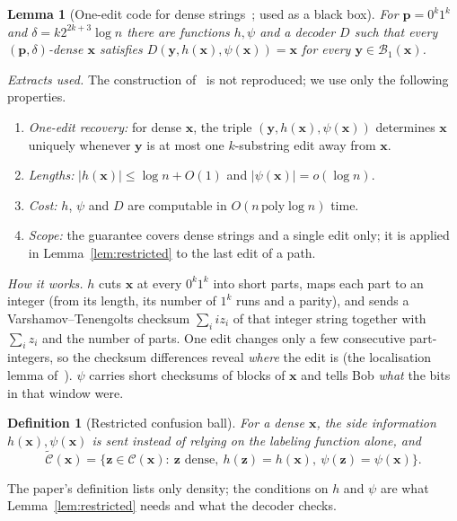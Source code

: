 \documentclass[journal,10pt]{IEEEtran}
\newtheorem{definition}{Definition}
\newtheorem{lemma}{Lemma}
\newcommand{\B}{\mathcal{B}}
\newcommand{\C}{\mathcal{C}}
\newcommand{\Ct}{\widetilde{\mathcal{C}}}
\newcommand{\bx}{\mathbf{x}}
\newcommand{\by}{\mathbf{y}}
\newcommand{\bz}{\mathbf{z}}
\newcommand{\bp}{\mathbf{p}}
\begin{document}
\begin{lemma}[One-edit code for dense strings~\cite{li22}; used as a black box]\label{lem:onecode}
For $\bp=0^k1^k$ and $\delta=k2^{2k+3}\log n$ there are functions $h,\psi$ and a decoder $D$ such that every $(\bp,\delta)$-dense $\bx$ satisfies $D(\by,h(\bx),\psi(\bx))=\bx$ for every $\by\in\B_1(\bx)$.
\end{lemma}
\emph{Extracts used.} The construction of~\cite{li22} is not reproduced; we use only the following properties.
\begin{enumerate}
\item[(F1)] \emph{One-edit recovery:} for dense $\bx$, the triple $(\by,h(\bx),\psi(\bx))$ determines $\bx$ uniquely whenever $\by$ is at most one $k$-substring edit away from $\bx$.
\item[(F2)] \emph{Lengths:} $|h(\bx)|\le\log n+O(1)$ and $|\psi(\bx)|=o(\log n)$.
\item[(F3)] \emph{Cost:} $h$, $\psi$ and $D$ are computable in $O(n\,\mathrm{poly}\log n)$ time.
\item[(F4)] \emph{Scope:} the guarantee covers dense strings and a single edit only; it is applied in Lemma~\ref{lem:restricted} to the last edit of a path.
\end{enumerate}
\emph{How it works.} $h$ cuts $\bx$ at every $0^k1^k$ into short parts, maps each part to an integer (from its length, its number of $1^k$ runs and a parity), and sends a Varshamov--Tenengolts checksum $\sum_i i z_i$ of that integer string together with $\sum_i z_i$ and the number of parts. One edit changes only a few consecutive part-integers, so the checksum differences reveal \emph{where} the edit is (the localisation lemma of~\cite{li22}). $\psi$ carries short checksums of blocks of $\bx$ and tells Bob \emph{what} the bits in that window were.

\begin{definition}[Restricted confusion ball]
For a dense $\bx$, the side information $h(\bx),\psi(\bx)$ is sent instead of relying on the labeling function alone, and
\[
\Ct(\bx)=\bigl\{\bz\in\C(\bx):\ \bz\text{ dense},\ h(\bz)=h(\bx),\ \psi(\bz)=\psi(\bx)\bigr\}.
\]
\end{definition}
The paper's definition lists only density; the conditions on $h$ and $\psi$ are what Lemma~\ref{lem:restricted} needs and what the decoder checks.
\end{document}
